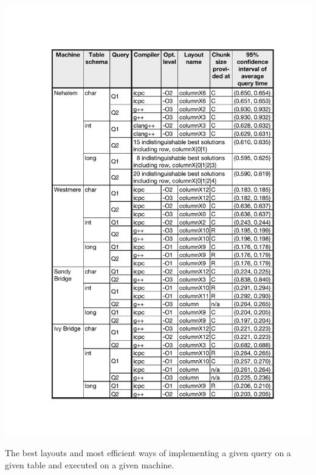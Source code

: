 \documentclass{sig-alternate}
\begin{document}
\begin{table}[!b]
\includegraphics[width=.478\textwidth]{pdf/problem_bests_table.pdf}
\vspace*{-20pt}
\caption{The best layouts and most efficient ways of implementing a given query on a given table and executed on a given machine.}  
\label{fig:problem_bests_table}
\end{table}
\end{document}

